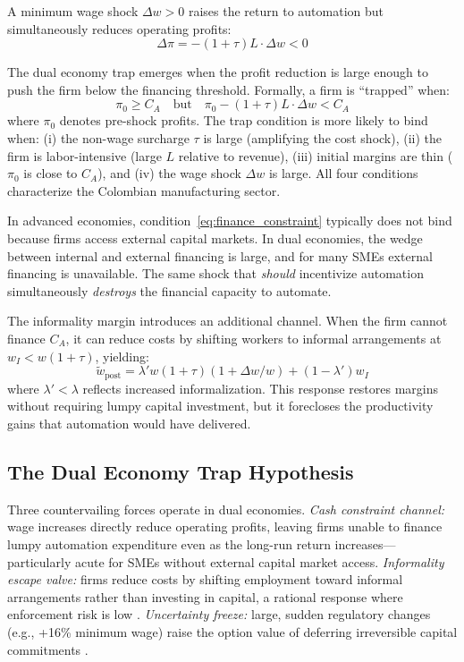 \documentclass[5p,times,authoryear]{elsarticle}
\begin{document}
A minimum wage shock $\Delta w > 0$ raises the return to automation but simultaneously reduces operating profits:
\begin{equation}
\label{eq:profit_reduction}
\Delta \pi = -(1+\tau) L \cdot \Delta w < 0
\end{equation}

The dual economy trap emerges when the profit reduction is large enough to push the firm below the financing threshold. Formally, a firm is ``trapped'' when:
\begin{equation}
\label{eq:trap_condition}
\pi_0 \geq C_A \quad \text{but} \quad \pi_0 - (1+\tau)L \cdot \Delta w < C_A
\end{equation}
where $\pi_0$ denotes pre-shock profits. The trap condition is more likely to bind when: (i) the non-wage surcharge $\tau$ is large (amplifying the cost shock), (ii) the firm is labor-intensive (large $L$ relative to revenue), (iii) initial margins are thin ($\pi_0$ is close to $C_A$), and (iv) the wage shock $\Delta w$ is large. All four conditions characterize the Colombian manufacturing sector.

In advanced economies, condition~\eqref{eq:finance_constraint} typically does not bind because firms access external capital markets. In dual economies, the wedge between internal and external financing is large, and for many SMEs external financing is unavailable. The same shock that \emph{should} incentivize automation simultaneously \emph{destroys} the financial capacity to automate.

The informality margin introduces an additional channel. When the firm cannot finance $C_A$, it can reduce costs by shifting workers to informal arrangements at $w_I < w(1+\tau)$, yielding:
\begin{equation}
\label{eq:informalize}
\tilde{w}_{\text{post}} = \lambda' w(1+\tau)(1 + \Delta w/w) + (1-\lambda') w_I
\end{equation}
where $\lambda' < \lambda$ reflects increased informalization. This response restores margins without requiring lumpy capital investment, but it forecloses the productivity gains that automation would have delivered.

\subsection{The Dual Economy Trap Hypothesis}
\label{subsec:trap_hypothesis}

Three countervailing forces operate in dual economies. \textit{Cash constraint channel:} wage increases directly reduce operating profits, leaving firms unable to finance lumpy automation expenditure even as the long-run return increases---particularly acute for SMEs without external capital market access. \textit{Informality escape valve:} firms reduce costs by shifting employment toward informal arrangements rather than investing in capital, a rational response where enforcement risk is low \citep{ulyssea2018}. \textit{Uncertainty freeze:} large, sudden regulatory changes (e.g., +16\% minimum wage) raise the option value of deferring irreversible capital commitments \citep{prettner2020innovation}.
\end{document}
